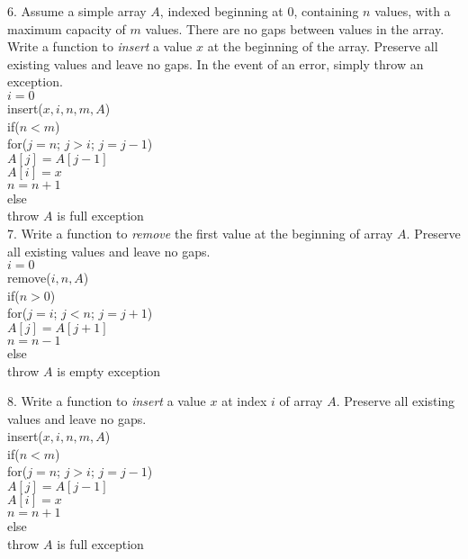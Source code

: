 \documentclass[12pt]{article}
\begin{document}
\begin{flushleft}
6. Assume a simple array $A$, indexed beginning at $0$, containing $n$ values, with a maximum capacity of $m$ values. There are no gaps between values in the array. Write a function to \textit{insert} a value $x$ at the beginning of the array. Preserve all existing values and leave no gaps. In the event of an error, simply throw an exception.\\[.5in]

$i=0$\\
insert($x,i,n,m,A$) \\
\quad if($n<m$) \\
\qquad for($j=n$; $j>i$; $j=j-1$) \\
\qquad \quad $A[j]=A[j-1]$ \\
\qquad $A[i]=x$\\
\qquad $n=n+1$\\
\quad else \\
\qquad throw $A$ is full exception \\[1.5in]

7. Write a function to \textit{remove} the first value at the beginning of array $A$. Preserve all existing values and leave no gaps.\\[.5in]
$i=0$\\
remove($i,n,A$)\\
\quad if($n>0$) \\
\qquad for($j=i$; $j<n$; $j=j+1$)\\
\quad \qquad $A[j]=A[j+1]$\\
\qquad $n=n-1$\\
\quad else \\
\qquad throw $A$ is empty exception
\newpage

8. Write a function to \textit{insert} a value $x$ at index $i$ of array $A$. Preserve all existing values and leave no gaps.\\[.5in]

insert($x,i,n,m,A$) \\
\quad if($n<m$) \\
\qquad for($j=n$; $j>i$; $j=j-1$) \\
\qquad \quad $A[j]=A[j-1]$ \\
\qquad $A[i]=x$\\
\qquad $n=n+1$\\
\quad else \\
\qquad throw $A$ is full exception \\[1.5in]


\end{flushleft}
\end{document}
